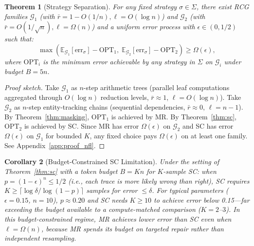 \documentclass{article}
\newtheorem{theorem}{Theorem}
\newtheorem{corollary}[theorem]{Corollary}
\begin{document}
\begin{theorem}[Strategy Separation]
\label{thm:nfl}
For any fixed strategy $\sigma \in \Sigma$, there exist RCG families $\mathcal{G}_1$ (with $\bar{r} = 1 - O(1/n), \ell = O(\log n)$) and $\mathcal{G}_2$ (with $\bar{r} = O(1/\sqrt{n}), \ell = \Omega(n)$) and a uniform error process with $\epsilon \in (0, 1/2)$ such that:
\begin{equation}
\max\!\left(\mathbb{E}_{\mathcal{G}_1}[\text{err}_\sigma] - \text{OPT}_1,\; \mathbb{E}_{\mathcal{G}_2}[\text{err}_\sigma] - \text{OPT}_2\right) \geq \Omega(\epsilon),
\end{equation}
where $\text{OPT}_i$ is the minimum error achievable by any strategy in $\Sigma$ on $\mathcal{G}_i$ under budget $B = 5n$.
\end{theorem}

\begin{proof}[Proof sketch]
Take $\mathcal{G}_1$ as $n$-step arithmetic trees (parallel leaf computations aggregated through $O(\log n)$ reduction levels, $\bar{r} \approx 1$, $\ell = O(\log n)$). Take $\mathcal{G}_2$ as $n$-step entity-tracking chains (sequential dependencies, $\bar{r} \approx 0$, $\ell = n-1$). By Theorem~\ref{thm:masking}, $\text{OPT}_1$ is achieved by MR. By Theorem~\ref{thm:sc}, $\text{OPT}_2$ is achieved by SC. Since MR has error $\Omega(\epsilon)$ on $\mathcal{G}_2$ and SC has error $\Omega(\epsilon)$ on $\mathcal{G}_1$ for bounded $K$, any fixed choice pays $\Omega(\epsilon)$ on at least one family. See Appendix~\ref{app:proof_nfl}.
\end{proof}

\begin{corollary}[Budget-Constrained SC Limitation]
\label{cor:budget_sc}
Under the setting of Theorem~\ref{thm:sc} with a token budget $B = Kn$ for $K$-sample SC: when $p = (1-\epsilon)^n \leq 1/2$ (i.e., each trace is more likely wrong than right), SC requires $K \geq \lceil\log\delta / \log(1-p)\rceil$ samples for error $\leq \delta$. For typical parameters ($\epsilon = 0.15$, $n = 10$), $p \approx 0.20$ and SC needs $K \geq 10$ to achieve error below 0.15---far exceeding the budget available to a compute-matched comparison ($K = 2$--$3$). In this \emph{budget-constrained} regime, MR achieves lower error than SC even when $\ell = \Omega(n)$, because MR spends its budget on targeted repair rather than independent resampling.
\end{corollary}
\end{document}
